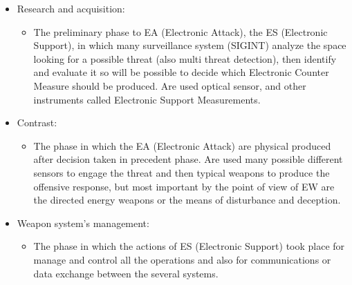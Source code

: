 \documentclass[12pt]{report}
\begin{document}
\begin{itemize}
     \item Research and acquisition:
     \begin{itemize}
        \item The preliminary phase to EA (Electronic Attack), the ES (Electronic Support), in which many surveillance system (SIGINT) analyze the space looking for a possible threat (also multi threat detection), then identify and evaluate it so will be possible to decide which Electronic Counter Measure should be produced. Are used optical sensor, and other instruments called Electronic Support Measurements.
        \end{itemize}
    \item Contrast:
        \begin{itemize}
            \item The phase in which the EA (Electronic Attack) are physical produced after decision taken in precedent phase. Are used many possible different sensors to engage the threat and then typical weapons to produce the offensive response, but most important by the point of view of EW are the directed energy weapons or the means of disturbance and deception.   
        \end{itemize}
    \item Weapon system's management:
        \begin{itemize}
            \item The phase in which the actions of ES (Electronic Support) took place for manage and control all the operations and also for communications or data exchange between the several systems.
        \end{itemize}   
    \end{itemize}
   
\end{document}
